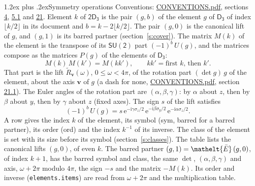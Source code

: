 \documentclass[10pt,a4paper]{article}
\makeatletter
\renewcommand\section{\@startsection{section}{1}{\z@}{-3ex plus -1ex minus -.2ex}%
  {1.2ex plus .2ex}{\normalfont\large\sffamily\bfseries\color{parttitle}}}
\numberwithin{equation}{section}
\newcommand{\eltfont}[1]{{\let\sigma\eltsigma\mathelt{#1}}}
\newcommand{\grp}[1]{\mathsf{#1}}
\newcommand{\elt}[1]{\eltfont{#1}}
\newcommand{\vv}{\mathbf{v}}
\newcommand{\iunit}{\mathrm{i}}
\newcommand{\expe}{\mathrm{e}}
\newcommand{\barred}[1]{\bar{#1}}
\newcommand{\lift}[1]{\tilde{#1}}
\newcommand{\pauli}[1]{\sigma_{#1}}
\makeatother
\begin{document}
\section{Symmetry operations}\label{s:elements}
Conventions: \href{../../CONVENTIONS.pdf}{CONVENTIONS.pdf}, sections \href{../../../rotation/CONVENTIONS.pdf\#conv.4}{4}, \href{../../../rotation/CONVENTIONS.pdf\#conv.5.1}{5.1} and \href{../../CONVENTIONS.pdf\#conv.21}{21}.
\leavevmode\label{n:index.element}\label{n:element.g}Element $k$ of $\grp{2D_{3}}$ is the pair $(g, b)$ of the element $g$ of \href{../../../rotation/data/pdf/D3.pdf}{$\grp{D_{3}}$} of index $\lfloor k/2\rfloor$ in its document and $b = k - 2\lfloor k/2\rfloor$. The pair $(g, 0)$ is the canonical lift of $g$, and $(g, 1)$ is its barred partner (section~\ref{s:cover}). \label{n:matrix.element.pin}\label{n:matrix.element}The matrix $M(k)$ of the element is the transpose of its $\grp{SU(2)}$ part $(-1)^{b}\,U(g)$, and the matrices compose as the matrices $P(g)$ of the elements of $\grp{D_{3}}$:
\begin{equation}\label{e:mprod}M(k)\,M(k') = M(kk'),\qquad kk' = \text{first } k\text{, then } k'.\end{equation}
\leavevmode\label{n:angle.omega}\label{n:vector.axis}\label{n:vector.pole}That part is the lift $\lift{R}_{\vv}(\omega)$, $0 \le \omega < 4\pi$, of the rotation part $(\det g)\,g$ of the element, about the axis $\vv$ of $g$ (a dash for none, \href{../../CONVENTIONS.pdf}{CONVENTIONS.pdf}, section \href{../../CONVENTIONS.pdf\#conv.21.1}{21.1}). \label{n:angle.euler.alpha}\label{n:angle.euler.beta}\label{n:angle.euler.gamma}\label{n:vector.coordinates}The Euler angles of the rotation part are $(\alpha,\beta,\gamma)$: by $\alpha$ about $z$, then by $\beta$ about $y$, then by $\gamma$ about $z$ (fixed axes). \label{n:local.euler.sign}The sign $s$ of the lift satisfies
\begin{equation}\label{e:euler}(-1)^{b}\,U(g) = s\,\expe^{-\iunit\gamma\pauli{z}/2}\,\expe^{-\iunit\beta\pauli{y}/2}\,\expe^{-\iunit\alpha\pauli{z}/2}.\end{equation}
\leavevmode\label{n:index.element.inverse}\label{n:head.sym}\label{n:head.ord}A row gives the index $k$ of the element, its symbol (sym, barred for a barred partner), its order (ord) and the index $k^{-1}$ of its inverse. \label{n:head.class}The class of the element is set with its size before its symbol (section~\ref{s:classes}).
The table lists the canonical lifts $(g, 0)$, of even $k$. The barred partner $(g, 1) = \elt{\barred{E}}\,(g, 0)$, of index $k + 1$, has the barred symbol and class, the same $\det$, $(\alpha,\beta,\gamma)$ and axis, $\omega + 2\pi$ modulo $4\pi$, the sign $-s$ and the matrix $-M(k)$. Its order and inverse (\texttt{elements.items}) are read from $\omega + 2\pi$ and the multiplication table.
\end{document}
